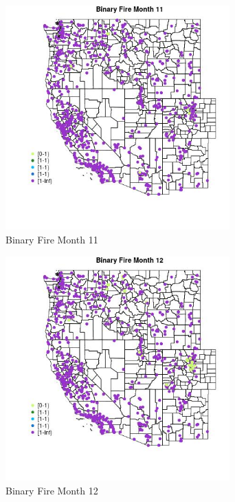 \begin{figure} 
\centering  
\includegraphics[width=0.77\textwidth]{Code_Outputs/Report_ML_input_PM25_Step4_part_f_de_duplicated_aves_prioritize_24hr_obswNAs_MapObsMo11Binary_Fire.jpg} 
\caption{\label{fig:Report_ML_input_PM25_Step4_part_f_de_duplicated_aves_prioritize_24hr_obswNAsMapObsMo11Binary_Fire}Binary Fire Month 11} 
\end{figure} 
 

\begin{figure} 
\centering  
\includegraphics[width=0.77\textwidth]{Code_Outputs/Report_ML_input_PM25_Step4_part_f_de_duplicated_aves_prioritize_24hr_obswNAs_MapObsMo12Binary_Fire.jpg} 
\caption{\label{fig:Report_ML_input_PM25_Step4_part_f_de_duplicated_aves_prioritize_24hr_obswNAsMapObsMo12Binary_Fire}Binary Fire Month 12} 
\end{figure} 
 

